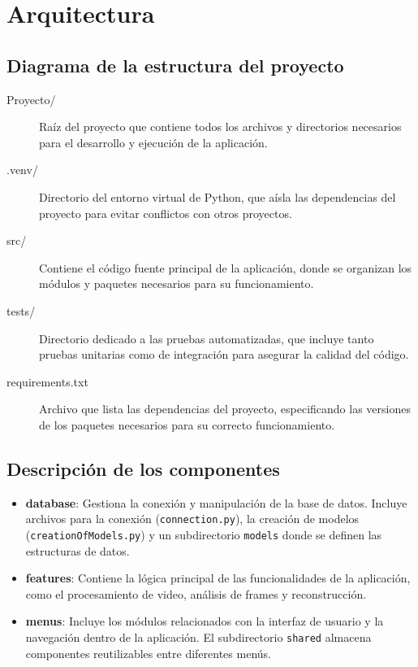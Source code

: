 \section{Arquitectura}

\subsection{Diagrama de la estructura del proyecto}

	\begin{description}
		\item[Proyecto/]  
		Raíz del proyecto que contiene todos los archivos y directorios necesarios para el desarrollo y ejecución de la aplicación.
		\item[.venv/]  
		Directorio del entorno virtual de Python, que aísla las dependencias del proyecto para evitar conflictos con otros proyectos.
		\item[src/]  
		Contiene el código fuente principal de la aplicación, donde se organizan los módulos y paquetes necesarios para su funcionamiento.
		\item[tests/]  
		Directorio dedicado a las pruebas automatizadas, que incluye tanto pruebas unitarias como de integración para asegurar la calidad del código.
		\item[requirements.txt]  
		Archivo que lista las dependencias del proyecto, especificando las versiones de los paquetes necesarios para su correcto funcionamiento.
	\end{description}

\subsection{Descripci\'on de los componentes}

\begin{itemize}
    \item \textbf{database}: Gestiona la conexión y manipulación de la base de datos. Incluye archivos para la conexión (\texttt{connection.py}), la creación de modelos (\texttt{creationOfModels.py}) y un subdirectorio \texttt{models} donde se definen las estructuras de datos.
    \item \textbf{features}: Contiene la lógica principal de las funcionalidades de la aplicación, como el procesamiento de video, análisis de frames y reconstrucción.
    \item \textbf{menus}: Incluye los módulos relacionados con la interfaz de usuario y la navegación dentro de la aplicación. El subdirectorio \texttt{shared} almacena componentes reutilizables entre diferentes menús.
\end{itemize}


